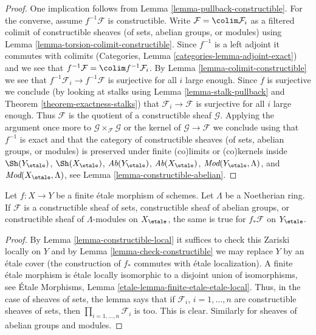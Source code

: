 \begin{proof}
One implication follows from Lemma \ref{lemma-pullback-constructible}.
For the converse, assume $f^{-1}\mathcal{F}$ is constructible.
Write $\mathcal{F} = \colim \mathcal{F}_i$ as a
filtered colimit of constructible sheaves (of sets, abelian groups, or modules)
using Lemma \ref{lemma-torsion-colimit-constructible}.
Since $f^{-1}$ is a left adjoint it commutes with colimits
(Categories, Lemma \ref{categories-lemma-adjoint-exact}) and we see that
$f^{-1}\mathcal{F} = \colim f^{-1}\mathcal{F}_i$.
By Lemma \ref{lemma-colimit-constructible} we see that
$f^{-1}\mathcal{F}_i \to f^{-1}\mathcal{F}$
is surjective for all $i$ large enough.
Since $f$ is surjective we conclude (by looking at stalks using
Lemma \ref{lemma-stalk-pullback} and
Theorem \ref{theorem-exactness-stalks})
that $\mathcal{F}_i \to \mathcal{F}$ is surjective for all $i$ large enough.
Thus $\mathcal{F}$ is the quotient of a constructible sheaf $\mathcal{G}$.
Applying the argument once more to
$\mathcal{G} \times_\mathcal{F} \mathcal{G}$ or
the kernel of $\mathcal{G} \to \mathcal{F}$
we conclude using that $f^{-1}$ is exact and that the category of
constructible sheaves (of sets, abelian groups, or modules) is
preserved under finite (co)limits or (co)kernels inside
$\Sh(Y_\etale)$, $\Sh(X_\etale)$, $\textit{Ab}(Y_\etale)$,
$\textit{Ab}(X_\etale)$, $\textit{Mod}(Y_\etale, \Lambda)$, and
$\textit{Mod}(X_\etale, \Lambda)$, see
Lemma \ref{lemma-constructible-abelian}.
\end{proof}

\begin{lemma}
\label{lemma-pushforward-constructible}
Let $f : X \to Y$ be a finite \'etale morphism of schemes. Let $\Lambda$ be a
Noetherian ring. If $\mathcal{F}$ is a constructible sheaf of sets,
constructible sheaf of abelian groups, or constructible sheaf of
$\Lambda$-modules on $X_\etale$, the same is true for
$f_*\mathcal{F}$ on $Y_\etale$.
\end{lemma}

\begin{proof}
By Lemma \ref{lemma-constructible-local} it suffices to check this
Zariski locally on $Y$ and by Lemma \ref{lemma-check-constructible}
we may replace $Y$ by an \'etale cover (the construction of $f_*$
commutes with \'etale localization). A finite \'etale morphism is
\'etale locally isomorphic to a disjoint union of isomorphisms, see
\'Etale Morphisms, Lemma \ref{etale-lemma-finite-etale-etale-local}.
Thus, in the case of sheaves of sets, the lemma says that if
$\mathcal{F}_i$, $i = 1, \ldots, n$ are constructible sheaves of sets, then
$\prod_{i = 1, \ldots, n} \mathcal{F}_i$ is too.
This is clear. Similarly for sheaves of abelian groups and modules.
\end{proof}

